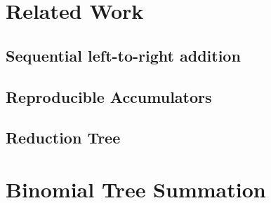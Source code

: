 \chapter{Related Work}
\label{ch:RelatedWork}

\section{Sequential left-to-right addition}
\label{sec:SequentialLeftToRightAddition}

\section{Reproducible Accumulators}
\label{sec:Reproducible Accumulators}

\section{Reduction Tree}
\label{sec:ReductionTree}

\chapter{Binomial Tree Summation}
\label{ch:BinomialTreeSummation}

